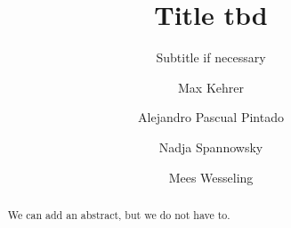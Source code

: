 \documentclass[sigconf]{acmart}
\begin{document}
\title{Title tbd}
\subtitle{Subtitle if necessary}

\author{Max Kehrer}

\author{Alejandro Pascual Pintado}

\author{Nadja Spannowsky}

\author{Mees Wesseling}

\begin{abstract}
We can add an abstract, but we do not have to.
\end{abstract}


\maketitle




\end{document}
